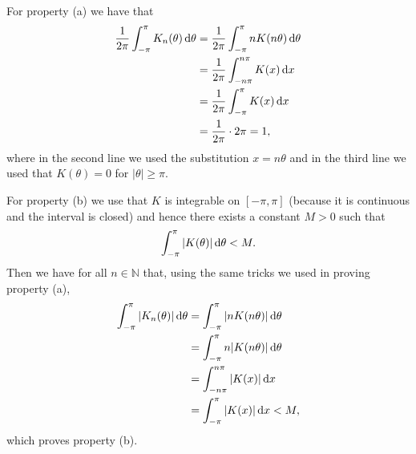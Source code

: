 \documentclass{article}
\newcommand{\N}{\mathbb{N}}
\begin{document}
For property (a) we have that
%
\begin{align*}
    \frac{1}{2 \pi} \int_{- \pi}^\pi K_n(\theta) \dif \theta
        &= \frac{1}{2 \pi} \int_{- \pi}^\pi n K(n \theta) \dif \theta \\
        &= \frac{1}{2 \pi} \int_{- n \pi}^{n \pi} K(x) \dif x \\
        &= \frac{1}{2 \pi} \int_{-\pi}^{\pi} K(x) \dif x \\
        &= \frac{1}{2 \pi} \cdot 2 \pi = 1
        ,
\end{align*}
%
where in the second line we used the substitution $x = n \theta$ and in
the third line we used that $K(\theta) = 0$ for $|\theta| \geq \pi$.

For property (b) we use that $K$ is integrable on $[-\pi, \pi]$ (because
it is continuous and the interval is closed) and hence there exists a
constant $M > 0$ such that
%
\begin{equation*}
    \int_{- \pi}^\pi |K(\theta)| \dif \theta < M
    .
\end{equation*}
%
Then we have for all $n \in \N$ that, using the same tricks we used
in proving property (a),
%
\begin{align*}
    \int_{- \pi}^\pi |K_n(\theta)| \dif \theta
        &= \int_{- \pi}^\pi |n K(n \theta)| \dif \theta \\
        &= \int_{- \pi}^\pi n |K(n \theta)| \dif \theta \\
        &= \int_{- n \pi}^{n \pi} |K(x)| \dif x \\
        &= \int_{-\pi}^{\pi} |K(x)| \dif x < M
        ,
\end{align*}
%
which proves property (b).
\end{document}
